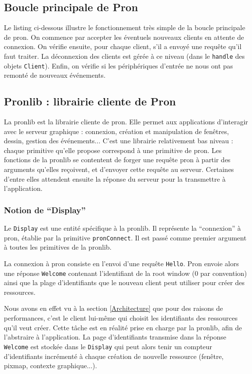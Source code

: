 \subsection{Boucle principale de Pron}

Le listing ci-dessous illustre le fonctionnement très simple de la boucle principale de pron. On commence par accepter les éventuels nouveaux clients en attente de connexion. On vérifie ensuite, pour chaque client, s'il a envoyé une requête qu'il faut traiter. La déconnexion des clients est gérée à ce niveau (dans le \verb|handle| des objets \verb|Client|). Enfin, on vérifie si les périphériques d'entrée ne nous ont pas remonté de nouveaux événements.



\subsection{Pronlib : librairie cliente de Pron}
\label{Pronlib}

La pronlib est la librairie cliente de pron. Elle permet aux applications d'interagir avec le serveur graphique : connexion, création et manipulation de fenêtres, dessin, gestion des événements... C'est une librairie relativement bas niveau : chaque primitive qu'elle propose correspond à une primitive de pron. Les fonctions de la pronlib se contentent de forger une requête pron à partir des arguments qu'elles reçoivent, et d'envoyer cette requête au serveur. Certaines d'entre elles attendent ensuite la réponse du serveur pour la transmettre à l'application.

\subsubsection{Notion de ``Display''}

Le \verb|Display| est une entité spécifique à la pronlib. Il représente la ``connexion'' à pron, établie par la primitive \verb|pronConnect|. Il est passé comme premier argument à toutes les primitives de la pronlib.

La connexion à pron consiste en l'envoi d'une requête \verb|Hello|. Pron envoie alors une réponse \verb|Welcome| contenant l'identifiant de la root window (0 par convention) ainsi que la plage d'identifiants que le nouveau client peut utiliser pour créer des ressources.

Nous avons en effet vu à la section \ref{Architecture} que pour des raisons de performances, c'est le client lui-même qui choisit les identifiants des ressources qu'il veut créer. Cette tâche est en réalité prise en charge par la pronlib, afin de l'abstraire à l'application. La page d'identifiants transmise dans la réponse \verb|Welcome| est stockée dans le \verb|Display| qui peut alors tenir un compteur d'identifiants incrémenté à chaque création de nouvelle ressource (fenêtre, pixmap, contexte graphique...).

